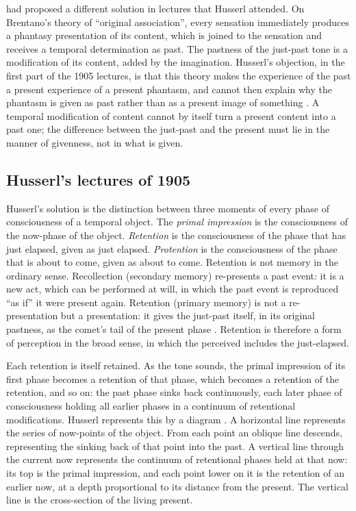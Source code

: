 \documentclass{situationist-preprint}
\begin{document}
\citet{Brentano1874} had proposed a different solution in lectures that Husserl attended. On Brentano's theory of \enquote{original association}, every sensation immediately produces a phantasy presentation of its content, which is joined to the sensation and receives a temporal determination as past. The pastness of the just-past tone is a modification of its content, added by the imagination. Husserl's objection, in the first part of the 1905 lectures, is that this theory makes the experience of the past a present experience of a present phantasm, and cannot then explain why the phantasm is given as past rather than as a present image of something \citep[\S\S 3--6]{Husserl1966}. A temporal modification of content cannot by itself turn a present content into a past one; the difference between the just-past and the present must lie in the manner of givenness, not in what is given.

\subsection{Husserl's lectures of 1905}

Husserl's solution is the distinction between three moments of every phase of consciousness of a temporal object. The \emph{primal impression} is the consciousness of the now-phase of the object. \emph{Retention} is the consciousness of the phase that has just elapsed, given as just elapsed. \emph{Protention} is the consciousness of the phase that is about to come, given as about to come. Retention is not memory in the ordinary sense. Recollection (secondary memory) re-presents a past event: it is a new act, which can be performed at will, in which the past event is reproduced \enquote{as if} it were present again. Retention (primary memory) is not a re-presentation but a presentation: it gives the just-past itself, in its original pastness, as the comet's tail of the present phase \citep[\S\S 11--19]{Husserl1966}. Retention is therefore a form of perception in the broad sense, in which the perceived includes the just-elapsed.

Each retention is itself retained. As the tone sounds, the primal impression of its first phase becomes a retention of that phase, which becomes a retention of the retention, and so on: the past phase sinks back continuously, each later phase of consciousness holding all earlier phases in a continuum of retentional modifications. Husserl represents this by a diagram \citep[\S 10]{Husserl1966}. A horizontal line represents the series of now-points of the object. From each point an oblique line descends, representing the sinking back of that point into the past. A vertical line through the current now represents the continuum of retentional phases held at that now: its top is the primal impression, and each point lower on it is the retention of an earlier now, at a depth proportional to its distance from the present. The vertical line is the cross-section of the living present.
\end{document}

